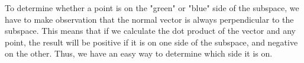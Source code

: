To determine whether a point is on the "green" or "blue" side of the subspace, we have to make observation that the normal vector is always perpendicular to the subspace. This means that if we calculate the dot product of the vector and any point, the result will be positive if it is on one side of the subspace, and negative on the other. Thus, we have an easy way to determine which side it is on.